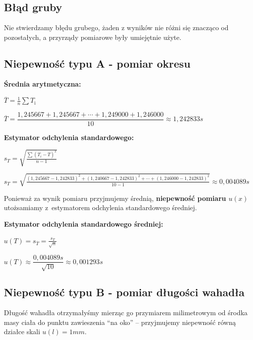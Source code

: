 \documentclass[a4paper,11pt]{article}
\begin{document}
\subsection{Błąd gruby}
Nie stwierdzamy błędu grubego, żaden z wyników nie różni się znacząco od pozostałych, a przyrządy pomiarowe były umiejętnie użyte.

\subsection{Niepewność typu A - pomiar okresu}

\begin{center}
\textbf{Średnia arytmetyczna:}
\end{center}
\begin{center}
$\overline{T}=\frac{1}{n}\sum T_{\mathrm{i}}$ 
\end{center}
\begin{center} 
$\overline{T}=\dfrac{1,245667+1,245667+\cdots+1,249000+1,246000}{10}\approx1,242833s$   
\end{center}
\break
\begin{center}
\textbf{Estymator odchylenia standardowego:}
\end{center}
\begin{center}
$s_{T}=\sqrt{\frac{\sum(T_{i}-\overline{T})^{2}}{n-1}}$
\end{center}
\begin{center}
$s_{T}=\sqrt{\frac{(1,245667-1,242833)^{2}+(1,240667-1,242833)^{2}+\cdots+(1,246000-1,242833)^{2}}{10-1}}\approx0,004089s$
\end{center}
Ponieważ za wynik pomiaru przyjmujemy średnią, \textbf{niepewność pomiaru $u(x)$} utożsamiamy z~estymatorem odchylenia standardowego średniej.
\begin{center}
\textbf{Estymator odchylenia standardowego średniej:}
\end{center}
\begin{center}
$u(T)=s_{\overline{T}}=\displaystyle \frac{s_{T}}{\sqrt{n}}$
\end{center}
\begin{center}
$u(T)\approx\dfrac{0,004089s}{\sqrt{10}}\approx0,001293s$  
\end{center}

\subsection{Niepewność typu B - pomiar długości wahadła}
Długość wahadła otrzymałyśmy mierząc go przymiarem milimetrowym od środka masy ciała do punktu zawieszenia ``na oko'' -- przyjmujemy niepewność równą działce skali $u(l) = 1mm$. 
\end{document}

